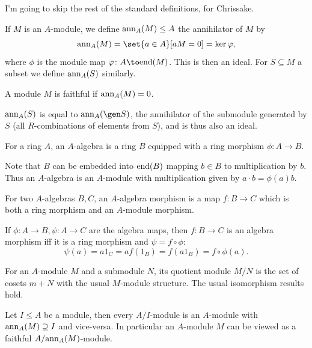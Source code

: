 \edefn

\bnote

    I'm going to skip the rest of the standard definitions, for Chrissake.

\enote

\bdefn

    If $M$ is an $A$-module, we define ${\rm ann}_A(M)\leq A$ the {\emphcolor annihilator} of $M$ by
    $$ \ann_A(M) = \set{a\in A}[aM=0] = \ker\phi , $$
    where $\phi$ is the module map $\phi\colon A\to\endo(M)$.
    This is then an ideal.
    For $S\subseteq M$ a subset we define ${\rm ann}_A(S)$ similarly.

    A module $M$ is {\emphcolor faithful} if ${\rm ann}_A(M)=0$.

\edefn

${\rm ann}_A(S)$ is equal to $\ann_A(\gen S)$, the annihilator of the submodule generated by $S$ (all $R$-combinations of elements from $S$),
and is thus also an ideal.

\bdefn

    For a ring $A$, an {\emphcolor $A$-algebra} is a ring $B$ equipped with a ring morphism $\phi\colon A\to B$.

\edefn

Note that $B$ can be embedded into ${\rm end}(B)$ mapping $b\in B$ to multiplication by $b$.
Thus an $A$-algebra is an $A$-module with multiplication given by $a\cdot b=\phi(a)b$.

\bdefn

    For two $A$-algebras $B,C$, an {\emphcolor $A$-algebra morphism} is a map $f\colon B\to C$ which is both a ring morphism and an
    $A$-module morphism.

\edefn

If $\phi\colon A\to B,\psi\colon A\to C$ are the algebra maps, then $f\colon B\to C$ is an algebra morphism iff it is a ring morphism and
$\psi=f\circ\phi$:
$$ \psi(a) = a1_C = af(1_B) = f(a1_B) = f\circ\phi(a) . $$

\bdefn

    For an $A$-module $M$ and a submodule $N$, its quotient module $M/N$ is the set of cosets $m+N$ with the usual $M$-module structure.
    The usual isomorphism results hold.

\edefn

\bprop

    Let $I\leq A$ be a module, then every $A/I$-module is an $A$-module with ${\rm ann}_A(M)\supseteq I$ and vice-versa.
    In particular an $A$-module $M$ can be viewed as a faithful $A/{\rm ann}_A(M)$-module.

